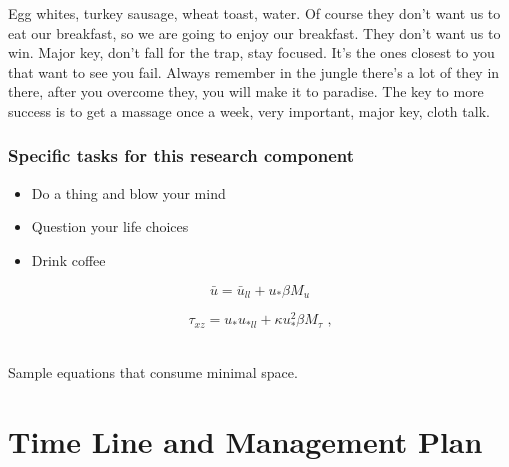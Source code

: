 Egg whites, turkey sausage, wheat toast, water. Of course they don't want us to eat our breakfast, so we are going to enjoy our breakfast. They don't want us to win. Major key, don't fall for the trap, stay focused.  It's the ones closest to you that want to see you fail. Always remember in the jungle there's a lot of they in there, after you overcome they, you will make it to paradise. The key to more success is to get a massage once a week, very important, major key, cloth talk.

\subsubsection{Specific tasks for this research component}
\begin{itemize}
\setlength\itemsep{0em}
\item Do a thing and blow your mind
\item Question your life choices
\item Drink coffee
\end{itemize}

\begin{center}
\begin{minipage}{.3\textwidth}
\begin{equation}
 \bar u = \bar u_{ll} + u_* \beta M_{u} \label{new_u}
\end{equation}
\end{minipage}
\begin{minipage}{.36\linewidth}
\begin{equation}
  \tau_{xz} = u_* u_{*ll} + \kappa u_*^2 \beta M_{\tau} \label{new_tau} \mbox{ ,}
\end{equation}
\end{minipage}
~\\Sample equations that consume minimal space.
\end{center}



\section{Time Line and Management Plan}

